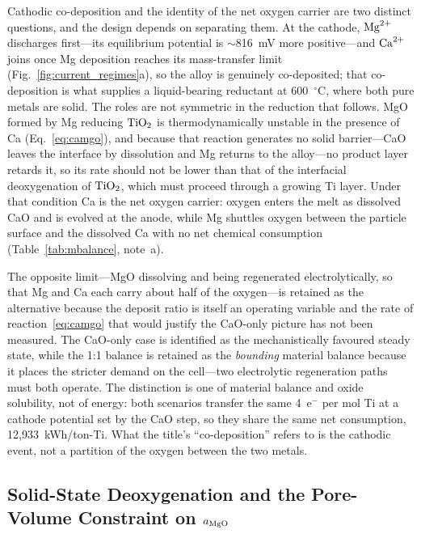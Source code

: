 \documentclass[pdflatex,sn-basic,Numbered]{sn-jnl}
\begin{document}
Cathodic co-deposition and the identity of the net oxygen carrier are two distinct questions, and the design depends on separating them. At the cathode, $\ce{Mg^{2+}}$ discharges first---its equilibrium potential is $\sim$816~mV more positive---and $\ce{Ca^{2+}}$ joins once Mg deposition reaches its mass-transfer limit (Fig.~\ref{fig:current_regimes}a), so the alloy is genuinely co-deposited; that co-deposition is what supplies a liquid-bearing reductant at 600~$^{\circ}$C, where both pure metals are solid. The roles are not symmetric in the reduction that follows. MgO formed by Mg reducing $\ce{TiO2}$ is thermodynamically unstable in the presence of Ca (Eq.~\ref{eq:camgo}), and because that reaction generates no solid barrier---CaO leaves the interface by dissolution and Mg returns to the alloy---no product layer retards it, so its rate should not be lower than that of the interfacial deoxygenation of $\ce{TiO2}$, which must proceed through a growing Ti layer. Under that condition Ca is the net oxygen carrier: oxygen enters the melt as dissolved CaO and is evolved at the anode, while Mg shuttles oxygen between the particle surface and the dissolved Ca with no net chemical consumption (Table~\ref{tab:mbalance}, note~a).

The opposite limit---MgO dissolving and being regenerated electrolytically, so that Mg and Ca each carry about half of the oxygen---is retained as the alternative because the deposit ratio is itself an operating variable and the rate of reaction~\ref{eq:camgo} that would justify the CaO-only picture has not been measured. The CaO-only case is identified as the mechanistically favoured steady state, while the 1:1 balance is retained as the \emph{bounding} material balance because it places the stricter demand on the cell---two electrolytic regeneration paths must both operate. The distinction is one of material balance and oxide solubility, not of energy: both scenarios transfer the same 4~e$^-$ per mol Ti at a cathode potential set by the CaO step, so they share the same net consumption, 12{,}933~kWh/ton-Ti. What the title's ``co-deposition'' refers to is the cathodic event, not a partition of the oxygen between the two metals.

\subsection{Solid-State Deoxygenation and the Pore-Volume Constraint on \texorpdfstring{$a_{\ce{MgO}}$}{aMgO}}
\end{document}
